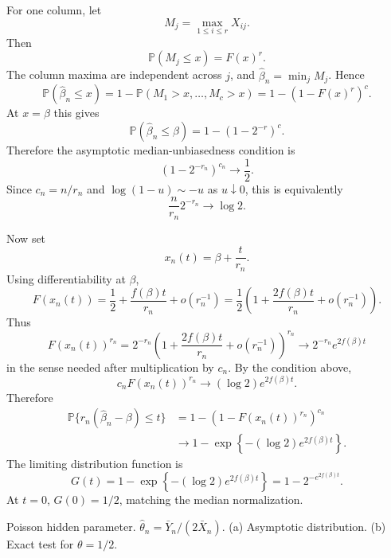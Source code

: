 \begin{solution}
For one column, let
\[
M_j=\max_{1\leq i\leq r}X_{ij}.
\]
Then
\[
\mathbb{P}(M_j\leq x)=F(x)^r.
\]
The column maxima are independent across $j$, and $\widehat{\beta}_n=\min_j M_j$. Hence
\[
\mathbb{P}(\widehat{\beta}_n\leq x)
=1-\mathbb{P}(M_1>x,\ldots,M_c>x)
=1-\left(1-F(x)^r\right)^c.
\]
At $x=\beta$ this gives
\[
\mathbb{P}(\widehat{\beta}_n\leq \beta)
=1-\left(1-2^{-r}\right)^c.
\]
Therefore the asymptotic median-unbiasedness condition is
\[
\left(1-2^{-r_n}\right)^{c_n}\to\frac{1}{2}.
\]
Since $c_n=n/r_n$ and $\log(1-u)\sim -u$ as $u\downarrow0$, this is equivalently
\[
\frac{n}{r_n}2^{-r_n}\to \log 2.
\]

Now set
\[
x_n(t)=\beta+\frac{t}{r_n}.
\]
Using differentiability at $\beta$,
\[
F(x_n(t))
=\frac{1}{2}+\frac{f(\beta)t}{r_n}+o(r_n^{-1})
=\frac{1}{2}\left(1+\frac{2f(\beta)t}{r_n}+o(r_n^{-1})\right).
\]
Thus
\[
F(x_n(t))^{r_n}
=2^{-r_n}\left(1+\frac{2f(\beta)t}{r_n}+o(r_n^{-1})\right)^{r_n}
\to 2^{-r_n}e^{2f(\beta)t}
\]
in the sense needed after multiplication by $c_n$. By the condition above,
\[
c_nF(x_n(t))^{r_n}\to (\log 2)e^{2f(\beta)t}.
\]
Therefore
\[
\begin{aligned}
\mathbb{P}\{r_n(\widehat{\beta}_n-\beta)\leq t\}
&=1-\left(1-F(x_n(t))^{r_n}\right)^{c_n}\\
&\to 1-\exp\left\{-(\log 2)e^{2f(\beta)t}\right\}.
\end{aligned}
\]
The limiting distribution function is
\[
\boxed{
G(t)=1-\exp\left\{-(\log 2)e^{2f(\beta)t}\right\}
=1-2^{-e^{2f(\beta)t}}.
}
\]
At $t=0$, $G(0)=1/2$, matching the median normalization.
\end{solution}

\begin{exercise}\label{probability:2024:6}
Poisson hidden parameter. $\hat{\theta}_n = \bar{Y}_n / (2\bar{X}_n)$.
(a) Asymptotic distribution.
(b) Exact test for $\theta=1/2$.
\end{exercise}


